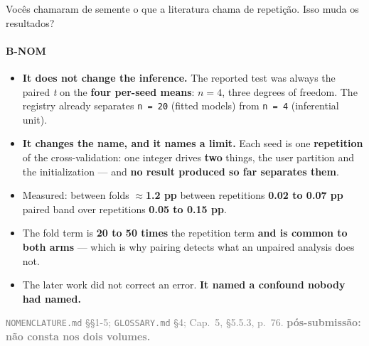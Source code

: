 \documentclass{beamer}
\begin{document}
\begin{frame}[noframenumbering]{Vocês chamaram de semente o que a literatura chama de repetição. Isso muda os resultados?}
    \framesubtitle{B-NOM}
    \hypertarget{bnom}{}
    \small
    \begin{itemize}\setlength{\itemsep}{0pt}\setlength{\parskip}{0pt}
        \item \textbf{It does not change the inference.} The reported test was always the paired \textit{t} on the \textbf{four per-seed means}: $n = 4$, three degrees of freedom. The registry already separates \texttt{n = 20} (fitted models) from \texttt{n = 4} (inferential unit).
        \item \textbf{It changes the name, and it names a limit.} Each seed is one \textbf{repetition} of the cross-validation: one integer drives \textbf{two} things, the user partition and the initialization --- and \textbf{no result produced so far separates them}.
        \item Measured: between folds $\approx$\textbf{1.2 pp} \textbullet{} between repetitions \textbf{0.02 to 0.07 pp} \textbullet{} paired band over repetitions \textbf{0.05 to 0.15 pp}.
        \item The fold term is \textbf{20 to 50 times} the repetition term \textbf{and is common to both arms} --- which is why pairing detects what an unpaired analysis does not.
        \item The later work did not correct an error. \textbf{It named a confound nobody had named.}
    \end{itemize}
    \vfill
    {\scriptsize
    \begin{minipage}[b]{0.775\linewidth}\raggedright\textcolor{gray}{\texttt{NOMENCLATURE.md} §§1-5; \texttt{GLOSSARY.md} §4; Cap.~5, §5.5.3, p.~76. \textbf{pós-submissão: não consta nos dois volumes.}}\end{minipage}\hfill
    \begin{minipage}[b]{0.20\linewidth}\raggedleft \hyperlink{b0}{}\end{minipage}}
\end{frame}
\end{document}
